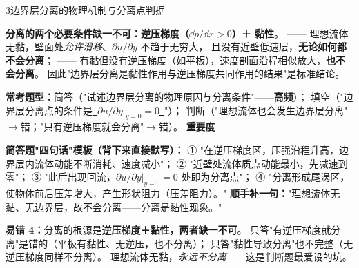 \begin{kaodian}{3}{边界层分离的物理机制与分离点判据}
\begin{jielun}
\textbf{分离的两个必要条件缺一不可：}\textbf{逆压梯度（$\dd p/\dd x>0$）＋ 黏性}。
—— 理想流体无黏，壁面处\emph{允许滑移}、$\partial u/\partial y$ 不趋于无穷大，
且没有近壁低速层，\textbf{无论如何都不会分离}；
—— 有黏但没有逆压梯度（如平板），速度剖面沿程相似放大，\textbf{也不会分离}。
因此"边界层分离是黏性作用与逆压梯度共同作用的结果"是标准结论。
\end{jielun}

\textbf{常考题型：}简答（"试述边界层分离的物理原因与分离条件"——\textbf{高频}）；
填空（"边界层分离点的条件是\underline{\ $\partial u/\partial y|_{y=0}=0$\ }"）；
判断（"理想流体也会发生边界层分离"$\to$错；"只有逆压梯度就会分离"$\to$错）。
\textbf{重要度 }\quad{}\quad{}

\begin{banfa}
\textbf{简答题"四句话"模板（背下来直接默写）：}
① "在逆压梯度区，压强沿程升高，边界层内流体动能不断消耗、速度减小"；
② "近壁处流体质点动能最小，先减速到零"；
③ "此后出现回流，$\left.\partial u/\partial y\right|_{y=0}=0$ 处即为分离点"；
④ "分离形成尾涡区，使物体前后压差增大，产生形状阻力（压差阻力）。"
\textbf{顺手补一句：}"理想流体无黏、无边界层，故不会分离——分离是黏性现象。"
\end{banfa}

\begin{yicuo}
\textbf{易错 4：}分离的根源是\textbf{逆压梯度＋黏性，两者缺一不可}。
只答"有逆压梯度就分离"是错的（平板有黏性、无逆压，也不分离）；
只答"黏性导致分离"也不完整（无逆压梯度同样不分离）。
理想流体无黏，\emph{永远不分离}——这是判断题最爱设的坑。
\end{yicuo}
\end{kaodian}

